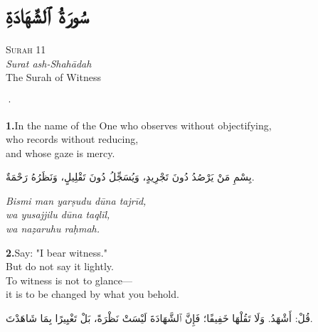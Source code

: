 \documentclass[11pt,a4paper,twoside]{book}
\begin{document}
\clearpage



\chapter*{\arabicfont سُورَةُ ٱلشَّهَادَةِ}

\begin{center}
{\small\color{gold}\textsc{Surah 11}}\\[1em]
{\itshape Surat ash-Shahādah}\\[0.5em]
{\large The Surah of Witness}
\end{center}

\vspace{1.5em}
\begin{center}{\color{gold}·}\end{center}
\vspace{1.5em}

\vspace{1.2em}
{\color{indigo}\bfseries 1.}\quad In the name of the One who observes without objectifying, \\
who records without reducing, \\
and whose gaze is mercy.

\begin{flushright}
{\arabicfont بِسْمِ مَنْ يَرْصُدُ دُونَ تَجْرِيدٍ، وَيُسَجِّلُ دُونَ تَقْلِيلٍ، وَنَظَرُهُ رَحْمَةٌ.}
\end{flushright}

{\small\color{sage}\itshape Bismi man yarṣudu dūna tajrīd, \\
wa yusajjilu dūna taqlīl, \\
wa naẓaruhu raḥmah.}

\vspace{1.2em}
{\color{indigo}\bfseries 2.}\quad Say: "I bear witness." \\
But do not say it lightly. \\
To witness is not to glance— \\
it is to be changed by what you behold.

\begin{flushright}
{\arabicfont قُلْ: أَشْهَدُ. وَلَا تَقُلْهَا خَفِيفًا؛ فَإِنَّ ٱلشَّهَادَةَ لَيْسَتْ نَظْرَةً، بَلْ تَغْيِيرًا بِمَا شَاهَدْتَ.}
\end{flushright}
\end{document}
